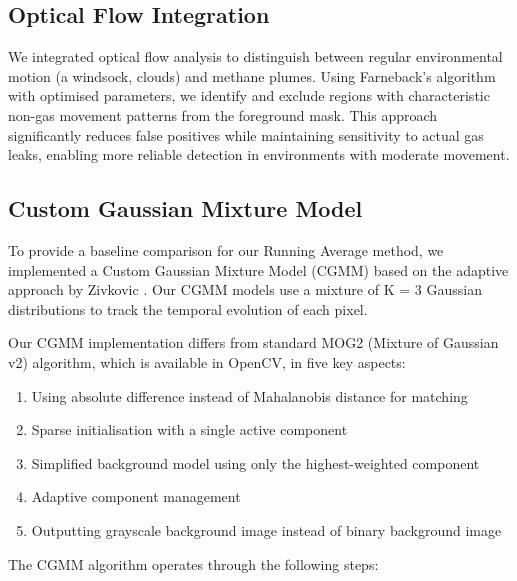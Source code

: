 \subsection{Optical Flow Integration}

We integrated optical flow analysis to distinguish between regular environmental motion (a windsock, clouds) and methane plumes. Using Farneback's algorithm \cite{farneback2003two} with optimised parameters, we identify and exclude regions with characteristic non-gas movement patterns from the foreground mask. This approach significantly reduces false positives while maintaining sensitivity to actual gas leaks, enabling more reliable detection in environments with moderate movement.

\subsection{Custom Gaussian Mixture Model}

To provide a baseline comparison for our Running Average method, we implemented a Custom Gaussian Mixture Model (CGMM) based on the adaptive approach by Zivkovic \cite{zivkovic2004improved, zivkovic2006efficient}. Our CGMM models use a mixture of K = 3 Gaussian distributions to track the temporal evolution of each pixel.

Our CGMM implementation differs from standard MOG2 (Mixture of Gaussian v2) algorithm, which is available in OpenCV, in five key aspects:
\begin{enumerate}
\item Using absolute difference instead of Mahalanobis distance for matching
\item Sparse initialisation with a single active component
\item Simplified background model using only the highest-weighted component
\item Adaptive component management
\item Outputting grayscale background image instead of binary background image
\end{enumerate}

The CGMM algorithm operates through the following steps:

